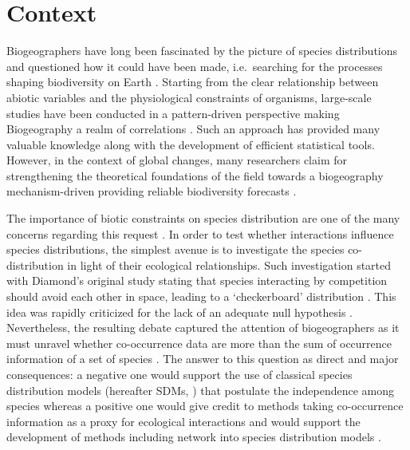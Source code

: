 \section{Context}\label{context}

Biogeographers have long been fascinated by the picture of species
distributions and questioned how it could have been made, i.e.~searching
for the processes shaping biodiversity on Earth
\citep{Engelbrecht2007, Tittensor2010}. Starting from the clear
relationship between abiotic variables and the physiological constraints
of organisms, large-scale studies have been conducted in a
pattern-driven perspective making Biogeography a realm of correlations
\citep{Gaston2000}. Such an approach has provided many valuable
knowledge along with the development of efficient statistical tools.
However, in the context of global changes, many researchers claim for
strengthening the theoretical foundations of the field towards a
biogeography mechanism-driven providing reliable biodiversity forecasts
\citep{Lomolino2000, Thuiller2013, Violle2014}.

The importance of biotic constraints on species distribution are one of
the many concerns regarding this request \citep{Godsoe2012, Araujo2014}.
In order to test whether interactions influence species distributions,
the simplest avenue is to investigate the species co-distribution in
light of their ecological relationships. Such investigation started with
Diamond's original study stating that species interacting by competition
should avoid each other in space, leading to a `checkerboard'
distribution \citep{Diamond1975}. This idea was rapidly criticized for
the lack of an adequate null hypothesis \citep{Connor1979, Gilpin1982}.
Nevertheless, the resulting debate captured the attention of
biogeographers as it must unravel whether co-occurrence data are more
than the sum of occurrence information of a set of species
\citep{Clark2014}. The answer to this question as direct and major
consequences: a negative one would support the use of classical species
distribution models (hereafter SDMs, \citet{Elith2009}) that postulate
the independence among species whereas a positive one would give credit
to methods taking co-occurrence information as a proxy for ecological
interactions \citep{Morales-Castilla2015} and would support the
development of methods including network into species distribution
models \citep{Ovaskainen2010, Pollock2014}.

